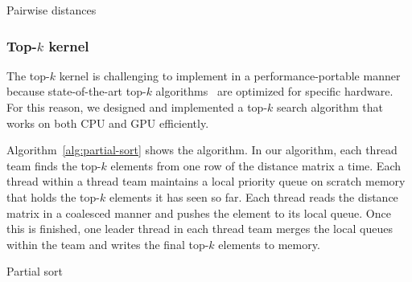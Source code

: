 \documentclass[sigconf]{acmart}
\begin{document}
\begin{algorithm}
    \SetAlgoLined
    \DontPrintSemicolon
    \caption{Pairwise distances}%
    \label{alg:distances}
\end{algorithm}

\subsubsection{Top-$k$ kernel}

The top-$k$ kernel is challenging to implement in a performance-portable manner
because state-of-the-art top-$k$ algorithms~\cite{Johnson2019,Shanbhag2018} are
optimized for specific hardware. For this reason, we designed and implemented a
top-$k$ search algorithm that works on both CPU and GPU efficiently.

Algorithm~\ref{alg:partial-sort} shows the algorithm. In our algorithm, each
thread team finds the top-$k$ elements from one row of the distance matrix a
time. Each thread within a thread team maintains a local priority queue on
scratch memory that holds the top-$k$ elements it has seen so far. Each thread
reads the distance matrix in a coalesced manner and pushes the element to its
local queue. Once this is finished, one leader thread in each thread team merges
the local queues within the team and writes the final top-$k$ elements to
memory.



\begin{algorithm}
    \SetAlgoLined
    \DontPrintSemicolon
    \caption{Partial sort}%
    \label{alg:partial-sort}
\end{algorithm}
\end{document}
